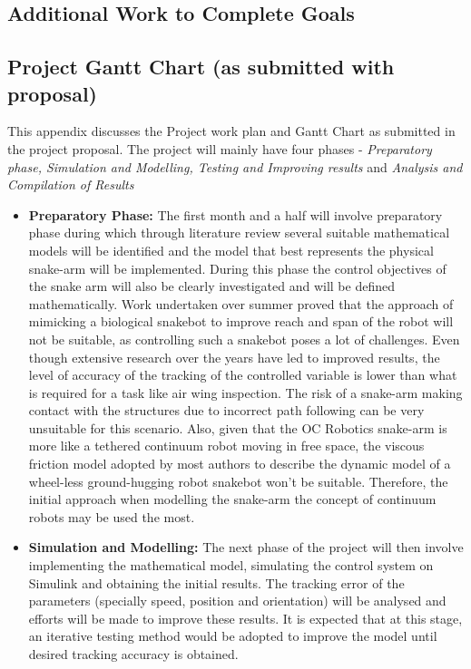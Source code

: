 \documentclass[a4paper,12pt]{report}
\begin{document}
\section{Additional Work to Complete Goals}



\begin{appendices}
	\chapter{Project Gantt Chart {\normalsize (as submitted with proposal)}}
	This appendix discusses the Project work plan and Gantt Chart as submitted in the project proposal.
	The project will mainly have four phases - \textit{Preparatory phase, Simulation and Modelling, Testing and Improving results} and \textit{Analysis and Compilation of Results}
	\begin{itemize}
		\item \textbf{Preparatory Phase:} The first month and a half will involve preparatory phase during which through literature review several suitable mathematical models will be identified and the model that best represents the physical snake-arm will be implemented. During this phase the control objectives of the snake arm will also be clearly investigated and will be defined mathematically.
		Work undertaken over summer proved that the approach of mimicking a biological snakebot to improve reach and span of the robot will not be suitable, as controlling such a snakebot poses a lot of challenges. Even though extensive research over the years have led to improved results, the level of accuracy of the tracking of the controlled variable is lower than what is required for a task like air wing inspection. The risk of a snake-arm making contact with the structures due to incorrect path following can be very unsuitable for this scenario. Also, given that the OC Robotics snake-arm is more like a tethered continuum robot moving in free space, the viscous friction model adopted by most authors to describe the dynamic model of a wheel-less ground-hugging robot snakebot won’t be suitable. Therefore, the initial approach when modelling the snake-arm the concept of continuum robots may be used the most.
		\item \textbf{Simulation and Modelling:} The next phase of the project will then involve implementing the mathematical model, simulating the control system on Simulink and obtaining the initial results. The tracking error of the parameters (specially speed, position and orientation) will be analysed and efforts will be made to improve these results. It is expected that at this stage, an iterative testing method would be adopted to improve the model until desired tracking accuracy is obtained.

\end{itemize}
\end{appendices}
\end{document}
